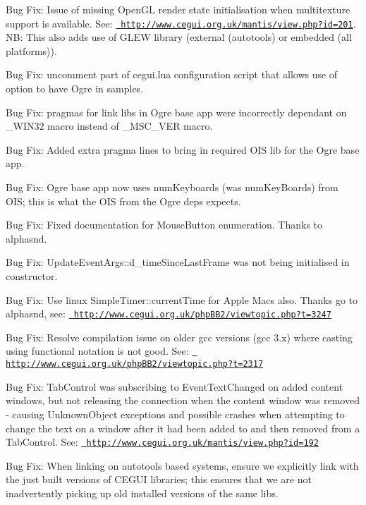 \begin{DoxyItemize}
\item Bug Fix\+: Issue of missing Open\+GL render state initialisation when multitexture support is available. See\+: \href{http://www.cegui.org.uk/mantis/view.php?id=201}{\texttt{ http\+://www.\+cegui.\+org.\+uk/mantis/view.\+php?id=201}}. NB\+: This also adds use of G\+L\+EW library (external (autotools) or embedded (all platforms)).
\item Bug Fix\+: uncomment part of cegui.\+lua configuration script that allows use of option to have Ogre in samples.
\item Bug Fix\+: pragmas for link libs in Ogre base app were incorrectly dependant on \+\_\+\+W\+I\+N32 macro instead of \+\_\+\+M\+S\+C\+\_\+\+V\+ER macro.
\item Bug Fix\+: Added extra pragma lines to bring in required O\+IS lib for the Ogre base app.
\item Bug Fix\+: Ogre base app now uses num\+Keyboards (was num\+Key\+Boards) from O\+IS; this is what the O\+IS from the Ogre deps expects.
\item Bug Fix\+: Fixed documentation for Mouse\+Button enumeration. Thanks to \textquotesingle{}alphasnd\textquotesingle{}.
\item Bug Fix\+: Update\+Event\+Args\+::d\+\_\+time\+Since\+Last\+Frame was not being initialised in constructor.
\item Bug Fix\+: Use linux Simple\+Timer\+::current\+Time for Apple Macs also. Thanks go to alphasnd, see\+: \href{http://www.cegui.org.uk/phpBB2/viewtopic.php?t=3247}{\texttt{ http\+://www.\+cegui.\+org.\+uk/php\+B\+B2/viewtopic.\+php?t=3247}}
\item Bug Fix\+: Resolve compilation issue on older gcc versions (gcc 3.\+x) where casting using functional notation is not good. See\+: \href{http://www.cegui.org.uk/phpBB2/viewtopic.php?t=2317}{\texttt{ http\+://www.\+cegui.\+org.\+uk/php\+B\+B2/viewtopic.\+php?t=2317}}
\item Bug Fix\+: Tab\+Control was subscribing to Event\+Text\+Changed on added content windows, but not releasing the connection when the content window was removed -\/ causing Unknown\+Object exceptions and possible crashes when attempting to change the text on a window after it had been added to and then removed from a Tab\+Control. See\+: \href{http://www.cegui.org.uk/mantis/view.php?id=192}{\texttt{ http\+://www.\+cegui.\+org.\+uk/mantis/view.\+php?id=192}}
\item Bug Fix\+: When linking on autotools based systems, ensure we explicitly link with the \textquotesingle{}just built\textquotesingle{} versions of C\+E\+G\+UI libraries; this ensures that we are not inadvertently picking up old installed versions of the same libs.

\end{DoxyItemize}
